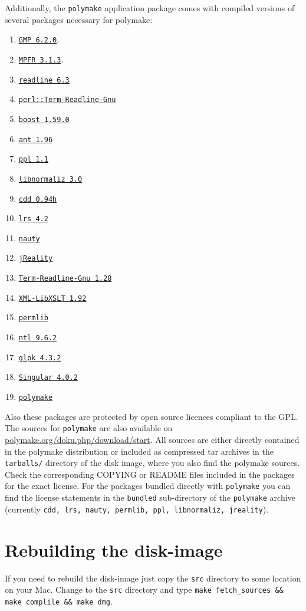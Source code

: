 \documentclass[a4paper]{amsart}
\newcommand{\polymake}{\texttt{polymake}\xspace}
\begin{document}
Additionally, the \polymake application package comes with compiled
versions of several packages necessary for polymake: 
\begin{enumerate}
\item \href{http://gmplib.org/}{\texttt{GMP 6.2.0}}.
\item \href{http://mpfr.org/}{\texttt{MPFR 3.1.3}}.
\item \href{http://tiswww.case.edu/php/chet/readline/rltop.html}{\texttt{readline 6.3}}
\item \href{http://search.cpan.org/dist/Term-ReadLine-Gnu/}{\texttt{perl::Term-Readline-Gnu}}
\item \href{http://www.boost.org/}{\texttt{boost 1.59.0}}
\item \href{http://ant.apache.org/}{\texttt{ant 1.96}}
\item \href{http://bugseng.com/products/ppl/}{\texttt{ppl 1.1}}
\item \href{http://www.home.uni-osnabrueck.de/wbruns/normaliz/}{\texttt{libnormaliz 3.0}}
\item \href{http://www.inf.ethz.ch/personal/fukudak/cdd_home/}{\texttt{cdd 0.94h}}
\item \href{http://cgm.cs.mcgill.ca/~avis/C/lrs.html}{\texttt{lrs 4.2}}
\item \href{http://cs.anu.edu.au/~bdm/nauty/}{\texttt{nauty}}
\item \href{http://www3.math.tu-berlin.de/jreality/}{\texttt{jReality}}
\item \href{http://search.cpan.org/~hayashi/Term-ReadLine-Gnu-1.20/Gnu.pm}{\texttt{Term-Readline-Gnu 1.28}}
\item \href{http://search.cpan.org/~shlomif/XML-LibXSLT-1.87/LibXSLT.pm}{\texttt{XML-LibXSLT 1.92}}
\item \href{http://www.math.uni-rostock.de/~rehn/software/permlib.html}{\texttt{permlib}}
\item \href{http://www.shoup.net/ntl/}{\texttt{ntl 9.6.2}}
\item \href{https://www.gnu.org/software/glpk/}{\texttt{glpk 4.3.2}}
\item \href{https://github.com/Singular/Sources}{\texttt{Singular 4.0.2}}
\item \href{https://github.com/polymake/polymake}{\texttt{polymake}}
\end{enumerate}
Also these packages are protected by open source licences compliant to
the GPL. The sources for \polymake are also available on \href{http://polymake.org/doku.php/download/start}{polymake.org/doku.php/download/start}. 
All sources are either directly contained in the 
polymake distribution or included as compressed tar archives in the
\texttt{tarballs/} directory of the disk image, where you also find the polymake sources. Check the
corresponding COPYING or README files included in the packages for the
exact license.  For the packages bundled directly with \polymake you
can find the license statements in the \texttt{bundled} sub-directory
of the \polymake archive (currently \texttt{cdd, lrs, nauty, permlib, ppl, libnormaliz, jreality}).

\section*{Rebuilding the disk-image}

If you need to rebuild the disk-image just copy the \texttt{src}
directory to some location on your Mac. Change to the \texttt{src}
directory and type \texttt{make fetch\_sources \&\& make complile \&\& make dmg}.
\end{document}
